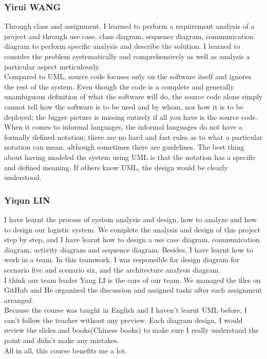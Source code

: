 \documentclass[12pt]{scrreprt}
\begin{document}
\subsubsection{Yirui WANG}
Through class and assignment, I learned to perform a requirement analysis of a project and through use case, class diagram, sequence diagram, communication diagram to perform specific analysis and describe the solution. I learned to consider the problem systematically and comprehensively as well as analysis a particular aspect meticulously.\\
Compared to UML, source code focuses only on the software itself and ignores the rest of the system. Even though the code is a complete and generally unambiguous definition of what the software will do, the source code alone simply cannot tell how the software is to be used and by whom, nor how it is to be deployed; the bigger picture is missing entirely if all you have is the source code. When it comes to informal languages, the informal languages do not have a formally defined notation; there are no hard and fast rules as to what a particular notation can mean, although sometimes there are guidelines. The best thing about having modeled the system using UML is that the notation has a specific and defined meaning. If others know UML, the design would be clearly understood.

\subsubsection{Yiqun LIN}
I have learnt the process of system analysis and design, how to analyze and how to design our logistic system. We complete the analysis and design of this project step by step, and I have learnt how to design a use case diagram, communication diagram, activity diagram and sequence diagram. Besides, I have learnt how to work in a team. In this teamwork, I was responsible for design diagram for scenario five and scenario six, and the architecture analysis diagram.\\
I think our team leader Yang LI is the core of our team. We managed the files on GitHub and He organized the discussion and assigned tasks after each assignment arranged.\\
Because the course was taught in English and I haven't learnt UML before, I can't follow the teacher without any preview. Each diagram design, I would review the slides and books(Chinese books) to make sure I really understand the point and didn't make any mistakes.\\
All in all, this course benefits me a lot.\\
\end{document}
